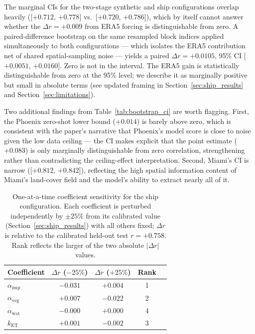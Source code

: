 \documentclass[12pt, letterpaper]{article}
\begin{document}
The marginal CIs for the two-stage synthetic and ship configurations overlap
heavily ([$+0.712$, $+0.778$] vs.\ [$+0.720$, $+0.786$]), which by itself
cannot answer whether the $\Delta r = +0.009$ from ERA5 forcing is
distinguishable from zero. A paired-difference bootstrap on the same
resampled block indices applied simultaneously to both configurations —
which isolates the ERA5 contribution net of shared spatial-sampling noise —
yields a paired $\Delta r = +0.0105$, 95\% CI [$+0.0051$, $+0.0160$].
Zero is not in the interval. The ERA5 gain is statistically distinguishable
from zero at the 95\% level; we describe it as marginally positive but
small in absolute terms (see updated framing in
Section~\ref{sec:ship_results} and Section~\ref{sec:limitations}).

Two additional findings from Table~\ref{tab:bootstrap_ci} are worth flagging.
First, the Phoenix zero-shot lower bound ($+0.014$) is barely above zero,
which is consistent with the paper's narrative that Phoenix's model score is
close to noise given the low data ceiling — the CI makes explicit that the
point estimate ($+0.083$) is only marginally distinguishable from zero
correlation, strengthening rather than contradicting the ceiling-effect
interpretation. Second, Miami's CI is narrow ([$+0.812$, $+0.842$]),
reflecting the high spatial information content of Miami's land-cover
field and the model's ability to extract nearly all of it.

\begin{table}[ht]
  \centering
  \caption{One-at-a-time coefficient sensitivity for the ship configuration.
  Each coefficient is perturbed independently by $\pm25\%$ from its
  calibrated value (Section~\ref{sec:ship_results}) with all others fixed;
  $\Delta r$ is relative to the calibrated held-out test $r = +0.758$.
  Rank reflects the larger of the two absolute $|\Delta r|$ values.}
  \label{tab:sensitivity}
  \begin{tabular}{lcccc}
    \toprule
    Coefficient & $\Delta r$ ($-25\%$) & $\Delta r$ ($+25\%$) & Rank \\
    \midrule
    $\alpha_{\mathrm{imp}}$ & $-0.031$ & $+0.004$ & 1 \\
    $\alpha_{\mathrm{veg}}$ & $+0.007$ & $-0.022$ & 2 \\
    $\alpha_{\mathrm{wat}}$ & $-0.000$ & $+0.000$ & 4 \\
    $k_{\mathrm{ET}}$       & $+0.001$ & $-0.002$ & 3 \\
    \bottomrule
  \end{tabular}
\end{table}
\end{document}

